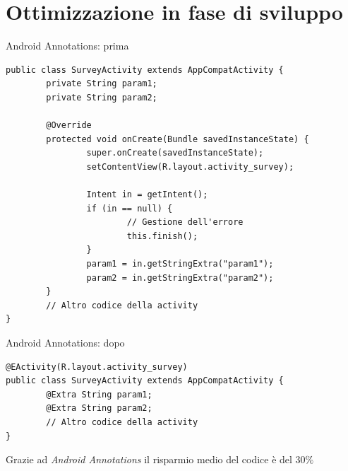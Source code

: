 \section{Ottimizzazione in fase di sviluppo}

\begin{frame}[c,fragile]{Android Annotations: prima}

\begin{center}
    \begin{minipage}{\textwidth}

\begin{listing}[H]
\scriptsize
\begin{verbatim}
public class SurveyActivity extends AppCompatActivity {
        private String param1;
        private String param2;

        @Override
        protected void onCreate(Bundle savedInstanceState) {
                super.onCreate(savedInstanceState);
                setContentView(R.layout.activity_survey);

                Intent in = getIntent();
                if (in == null) {
                        // Gestione dell'errore
                        this.finish();
                }
                param1 = in.getStringExtra("param1");
                param2 = in.getStringExtra("param2");
        }
        // Altro codice della activity
}
\end{verbatim}
\end{listing}

\end{minipage}
\end{center}

\end{frame}

\begin{frame}[c,fragile]{Android Annotations: dopo}

\begin{center}
\begin{minipage}{\textwidth}

\begin{listing}[H]
\scriptsize
\begin{verbatim}
@EActivity(R.layout.activity_survey)
public class SurveyActivity extends AppCompatActivity {
        @Extra String param1;
        @Extra String param2;
        // Altro codice della activity
}
\end{verbatim}
\end{listing}

\end{minipage}

Grazie ad \textit{Android Annotations} il risparmio medio del codice è del $30\%$

\end{center}

\end{frame}



